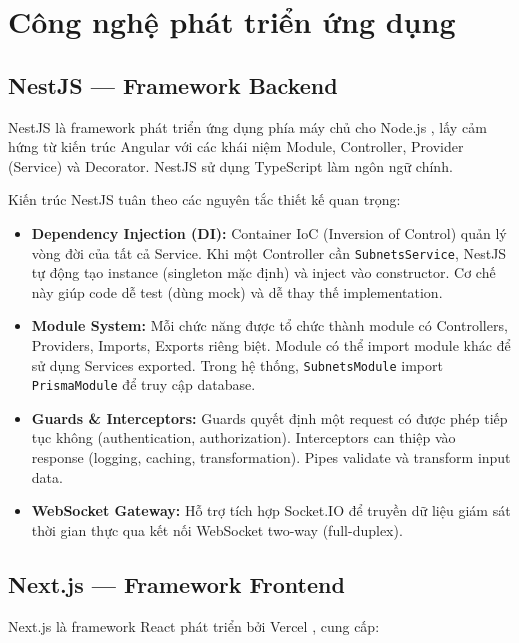 \section{Công nghệ phát triển ứng dụng}

\subsection{NestJS --- Framework Backend}

NestJS là framework phát triển ứng dụng phía máy chủ cho Node.js \cite{nestjs2023docs}, lấy cảm hứng từ kiến trúc Angular với các khái niệm Module, Controller, Provider (Service) và Decorator. NestJS sử dụng TypeScript làm ngôn ngữ chính.

Kiến trúc NestJS tuân theo các nguyên tắc thiết kế quan trọng:

\begin{itemize}
    \item \textbf{Dependency Injection (DI):} Container IoC (Inversion of Control) quản lý vòng đời của tất cả Service. Khi một Controller cần \texttt{SubnetsService}, NestJS tự động tạo instance (singleton mặc định) và inject vào constructor. Cơ chế này giúp code dễ test (dùng mock) và dễ thay thế implementation.

    \item \textbf{Module System:} Mỗi chức năng được tổ chức thành module có Controllers, Providers, Imports, Exports riêng biệt. Module có thể import module khác để sử dụng Services exported. Trong hệ thống, \texttt{SubnetsModule} import \texttt{PrismaModule} để truy cập database.

    \item \textbf{Guards \& Interceptors:} Guards quyết định một request có được phép tiếp tục không (authentication, authorization). Interceptors can thiệp vào response (logging, caching, transformation). Pipes validate và transform input data.

    \item \textbf{WebSocket Gateway:} Hỗ trợ tích hợp Socket.IO \cite{socketio2023docs} để truyền dữ liệu giám sát thời gian thực qua kết nối WebSocket two-way (full-duplex).
\end{itemize}

\subsection{Next.js --- Framework Frontend}

Next.js là framework React phát triển bởi Vercel \cite{nextjs2023docs}, cung cấp:

